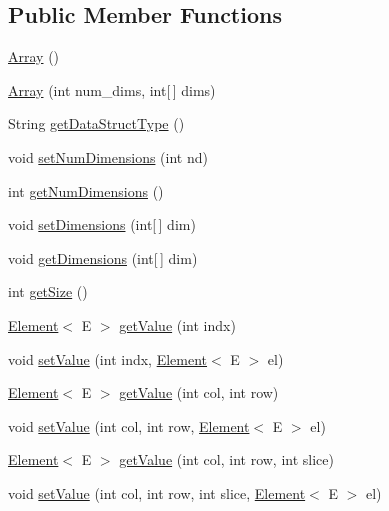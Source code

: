 \subsection*{Public Member Functions}
\begin{DoxyCompactItemize}
\item 
\hyperlink{classbridges_1_1base_1_1_array_ad5dbf7bbd9811c2dac16a5c135465d4b}{Array} ()
\item 
\hyperlink{classbridges_1_1base_1_1_array_ab37dbe6efe0c34242456971e430763f7}{Array} (int num\+\_\+dims, int\mbox{[}$\,$\mbox{]} dims)
\item 
String \hyperlink{classbridges_1_1base_1_1_array_ad138b9787d46d053d6bd324b344be9a6}{get\+Data\+Struct\+Type} ()
\item 
void \hyperlink{classbridges_1_1base_1_1_array_ab7859668a25d16adfdb308e24c7d44c6}{set\+Num\+Dimensions} (int nd)
\item 
int \hyperlink{classbridges_1_1base_1_1_array_a808da9a62df3f0e7a905ec895a82087a}{get\+Num\+Dimensions} ()
\item 
void \hyperlink{classbridges_1_1base_1_1_array_a7ec1260b85f7353ec00c873cf719eea1}{set\+Dimensions} (int\mbox{[}$\,$\mbox{]} dim)
\item 
void \hyperlink{classbridges_1_1base_1_1_array_af7aa7f3f18989af5f48a2b69cb7fb07d}{get\+Dimensions} (int\mbox{[}$\,$\mbox{]} dim)
\item 
int \hyperlink{classbridges_1_1base_1_1_array_a49a3a4ea72c8315f1f14eed25071d18a}{get\+Size} ()
\item 
\hyperlink{classbridges_1_1base_1_1_element}{Element}$<$ E $>$ \hyperlink{classbridges_1_1base_1_1_array_a40ba0fd6fb558c871e70691521e1c729}{get\+Value} (int indx)
\item 
void \hyperlink{classbridges_1_1base_1_1_array_af2d5b5e252f35e740ff4d89c22089ece}{set\+Value} (int indx, \hyperlink{classbridges_1_1base_1_1_element}{Element}$<$ E $>$ el)
\item 
\hyperlink{classbridges_1_1base_1_1_element}{Element}$<$ E $>$ \hyperlink{classbridges_1_1base_1_1_array_af777e1e68a1c91d22e4cb50db76e7bb6}{get\+Value} (int col, int row)
\item 
void \hyperlink{classbridges_1_1base_1_1_array_a9344b1197e5418ddb49f9c0c54472c90}{set\+Value} (int col, int row, \hyperlink{classbridges_1_1base_1_1_element}{Element}$<$ E $>$ el)
\item 
\hyperlink{classbridges_1_1base_1_1_element}{Element}$<$ E $>$ \hyperlink{classbridges_1_1base_1_1_array_a5aa6a1d31c6eadf8aa948ac2ea9a18fc}{get\+Value} (int col, int row, int slice)
\item 
void \hyperlink{classbridges_1_1base_1_1_array_a04ebaa617b830f74d3a0daff73001e37}{set\+Value} (int col, int row, int slice, \hyperlink{classbridges_1_1base_1_1_element}{Element}$<$ E $>$ el)
\end{DoxyCompactItemize}
